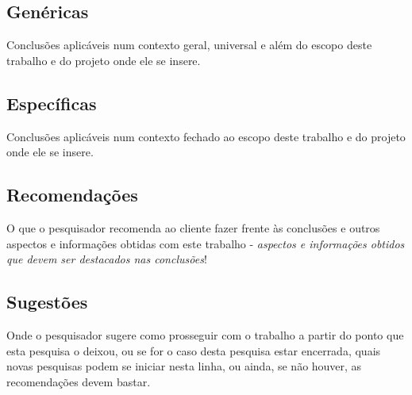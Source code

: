 \subsection{Genéricas}\label{US9999:genericas}

\begin{displayquote}
    Conclusões aplicáveis num contexto geral, universal e além do escopo deste trabalho e do projeto onde ele se insere.
\end{displayquote}


\subsection{Específicas}\label{US9999:especificas}

\begin{displayquote}
    Conclusões aplicáveis num contexto fechado ao escopo deste trabalho e do projeto onde ele se insere.
\end{displayquote}


\subsection{Recomendações}\label{US9999:recomendacoes}

\begin{displayquote}
    O que o pesquisador recomenda ao cliente fazer frente às conclusões e outros aspectos e informações obtidas com este trabalho - \textit{aspectos e informações obtidos que devem ser destacados nas conclusões}!
\end{displayquote}


\subsection{Sugestões}\label{US9999:sugestoes}

\begin{displayquote}
    Onde o pesquisador sugere como prosseguir com o trabalho a partir do ponto que esta pesquisa o deixou, ou se for o caso desta pesquisa estar encerrada, quais novas pesquisas podem se iniciar nesta linha, ou ainda, se não houver, as recomendações devem bastar.
\end{displayquote}